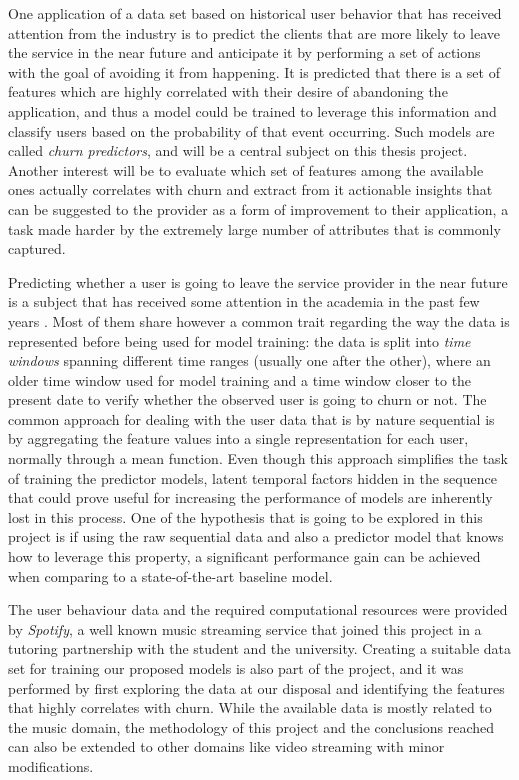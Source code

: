 \documentclass{kththesis}
\begin{document}
	One application of a data set based on historical user behavior that has received attention from the industry is to predict the clients that are more likely to leave the service in the near future and anticipate it by performing a set of actions with the goal of avoiding it from happening. It is predicted that there is a set of features which are highly correlated with their desire of abandoning the application, and thus a model could be trained to leverage this information and classify users based on the probability of that event occurring. Such models are called \emph{churn predictors}, and will be a central subject on this thesis project. Another interest will be to evaluate which set of features among the available ones actually correlates with churn and extract from it actionable insights that can be suggested to the provider as a form of improvement to their application, a task made harder by the extremely large number of attributes that is commonly captured.
	 
	Predicting whether a user is going to leave the service provider in the near future is a subject that has received some attention in the academia in the past few years . Most of them share however a common trait regarding the way the data is represented before being used for model training: the data is split into \emph{time windows} spanning different time ranges (usually one after the other), where an older time window used for model training and a time window closer to the present date to verify whether the observed user is going to churn or not. The common approach for dealing with the user data that is by nature sequential is by aggregating the feature values into a single representation for each user, normally through a mean function. Even though this approach simplifies the task of training the predictor models, latent temporal factors hidden in the sequence that could prove useful for increasing the performance of models are inherently lost in this process. One of the hypothesis that is going to be explored in this project is if using the raw sequential data and also a predictor model that knows how to leverage this property, a significant performance gain can be achieved when comparing to a state-of-the-art baseline model.
	 
	The user behaviour data and the required computational resources were provided by \emph{Spotify}, a well known music streaming service that joined this project in a tutoring partnership with the student and the university. Creating a suitable data set for training our proposed models is also part of the project, and it was performed by first exploring the data at our disposal and identifying the features that highly correlates with churn. While the available data is mostly related to the music domain, the methodology of this project and the conclusions reached can also be extended to other domains like video streaming with minor modifications.
	
\end{document}
